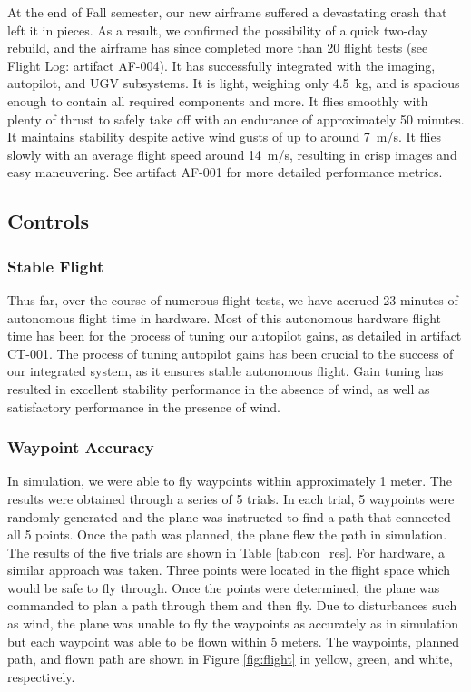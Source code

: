 \documentclass[]{auvsi_doc}
\begin{document}
At the end of Fall semester, our new airframe suffered a devastating crash that left it in pieces. As a result, we confirmed the possibility of a quick two-day rebuild, and the airframe has since completed more than 20 flight tests (see Flight Log: artifact AF-004). It has successfully integrated with the imaging, autopilot, and UGV subsystems. It is light, weighing only 4.5~kg, and is spacious enough to contain all required components and more. It flies smoothly with plenty of thrust to safely take off with an endurance of approximately 50 minutes. It maintains stability despite active wind gusts of up to around 7~m/s. It flies slowly with an average flight speed around 14~m/s, resulting in crisp images and easy maneuvering. See artifact AF-001 for more detailed performance metrics.

\subsection{Controls}

\subsubsection{Stable Flight}

Thus far, over the course of numerous flight tests, we have accrued 23 minutes of autonomous flight time in hardware. Most of this autonomous hardware flight time has been for the process of tuning our autopilot gains, as detailed in artifact CT-001. The process of tuning autopilot gains has been crucial to the success of our integrated system, as it ensures stable autonomous flight. Gain tuning has resulted in excellent stability performance in the absence of wind, as well as satisfactory performance in the presence of wind.

\subsubsection{Waypoint Accuracy}

In simulation, we were able to fly waypoints within approximately 1 meter. The results were obtained through a series of 5 trials. In each trial, 5 waypoints were randomly generated and the plane was instructed to find a path that connected all 5 points. Once the path was planned, the plane flew the path in simulation. The results of the five trials are shown in Table \ref{tab:con_res}. For hardware, a similar approach was taken. Three points were located in the flight space which would be safe to fly through. Once the points were determined, the plane was commanded to plan a path through them and then fly. Due to disturbances such as wind, the plane was unable to fly the waypoints as accurately as in simulation but each waypoint was able to be flown within 5 meters. The waypoints, planned path, and flown path are shown in Figure \ref{fig:flight} in yellow, green, and white, respectively.
\end{document}
